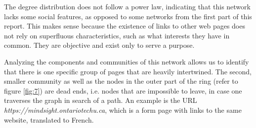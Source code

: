The degree distribution does not follow a power law, indicating that this network lacks some social features, as opposed to some networks from the first part of this report. This makes sense because the existence of links to other web pages does not rely on superfluous characteristics, such as what interests they have in common. They are objective and exist only to serve a purpose.

Analyzing the components and communities of this network allows us to identify that there is one specific group of pages that are heavily intertwined. The second, smaller community as well as the nodes in the outer part of the ring (refer to figure \ref{fig:7}) are dead ends, i.e. nodes that are impossible to leave, in case one traverses the graph in search of a path. An example is the URL \textit{https://mindsight.ontariotechu.ca}, which is a form page with links to the same website, translated to French.